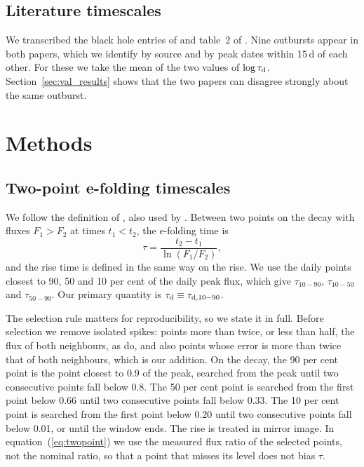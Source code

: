 \documentclass[fleqn,usenatbib]{mnras}
\newcommand{\taud}{\tau_{\rm d}}
\begin{document}
\subsection{Literature timescales}
\label{sec:literature}

We transcribed the black hole entries of \citet[][their tables 1 and 8; 42 outbursts]{YanYu2015} and table~2 of \citet[][33 outbursts and mini-outbursts]{Saraswati2025}. Nine outbursts appear in both papers, which we identify by source and by peak dates within 15\,d of each other. For these we take the mean of the two values of $\log\taud$. Section~\ref{sec:val_results} shows that the two papers can disagree strongly about the same outburst.

\section{Methods}
\label{sec:method}

\subsection{Two-point e-folding timescales}
\label{sec:tau}

We follow the definition of \citet{YanYu2015}, also used by \citet{Saraswati2025}. Between two points on the decay with fluxes $F_1>F_2$ at times $t_1<t_2$, the e-folding time is
\begin{equation}
\tau=\frac{t_2-t_1}{\ln(F_1/F_2)},
\label{eq:twopoint}
\end{equation}
and the rise time is defined in the same way on the rise. We use the daily points closest to 90, 50 and 10 per cent of the daily peak flux, which give $\tau_{10-90}$, $\tau_{10-50}$ and $\tau_{50-90}$. Our primary quantity is $\taud\equiv\tau_{\rm d,10-90}$.

The selection rule matters for reproducibility, so we state it in full. Before selection we remove isolated spikes: points more than twice, or less than half, the flux of both neighbours, as \citet{YanYu2015} do, and also points whose error is more than twice that of both neighbours, which is our addition. On the decay, the 90 per cent point is the point closest to 0.9 of the peak, searched from the peak until two consecutive points fall below 0.8. The 50 per cent point is searched from the first point below 0.66 until two consecutive points fall below 0.33. The 10 per cent point is searched from the first point below 0.20 until two consecutive points fall below 0.01, or until the window ends. The rise is treated in mirror image. In equation~(\ref{eq:twopoint}) we use the measured flux ratio of the selected points, not the nominal ratio, so that a point that misses its level does not bias $\tau$.
\end{document}
